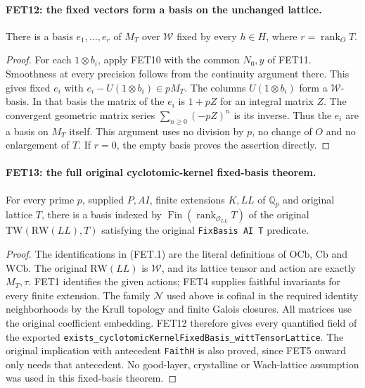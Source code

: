\paragraph{FET12: the fixed vectors form a basis on the unchanged lattice.}
\label{claim:FET12}
There is a basis $e_1,\ldots,e_r$ of $M_T$ over $\mathcal W$
fixed by every $h\in H$, where $r=\operatorname{rank}_O T$.

\begin{proof}
For each $1\otimes b_i$, apply FET10 with the common $N_0,y$
of FET11. Smoothness at every precision follows from the
continuity argument there. This gives fixed $e_i$ with
$e_i-U(1\otimes b_i)\in pM_T$.
The columns $U(1\otimes b_i)$ form a $\mathcal W$-basis.
In that basis the matrix of the $e_i$ is $1+pZ$ for an
integral matrix $Z$. The convergent geometric matrix series
$\sum_{n\geq0}(-pZ)^n$ is its inverse.
Thus the $e_i$ are a basis on $M_T$ itself. This argument
uses no division by $p$, no change of $O$ and no enlargement
of $T$. If $r=0$, the empty basis proves the assertion directly.
\end{proof}

\paragraph{FET13: the full original cyclotomic-kernel fixed-basis theorem.}
\label{claim:FET13}
For every prime $p$, supplied $P,AI$, finite extensions $K,LL$ of $\mathbb Q_p$ and
original lattice $T$, there is a basis indexed by
$\operatorname{Fin}(\operatorname{rank}_{\mathcal O_{LL}}T)$
of the original $\mathrm{TW}(\mathrm{RW}(LL),T)$ satisfying
the original \texttt{FixBasis AI T} predicate.

\begin{proof}
The identifications in (FET.1) are the literal definitions of
$\mathrm{OCb}$, $\mathrm{Cb}$ and $\mathrm{WCb}$. The original
$\mathrm{RW}(LL)$ is $\mathcal W$, and its lattice tensor and
action are exactly $M_T,\tau$. FET1 identifies the given actions;
FET4 supplies faithful invariants for every finite extension.
The family $\mathcal N$ used above is cofinal in the required
identity neighborhoods by the Krull topology and finite Galois
closures. All matrices use the original coefficient embedding.
FET12 therefore gives every quantified field of the exported
\texttt{exists\_cyclotomicKernelFixedBasis\_wittTensorLattice}.
The original implication with antecedent \texttt{FaithH} is
also proved, since FET5 onward only needs that antecedent.
No good-layer, crystalline or Wach-lattice assumption was used
in this fixed-basis theorem.
\end{proof}

